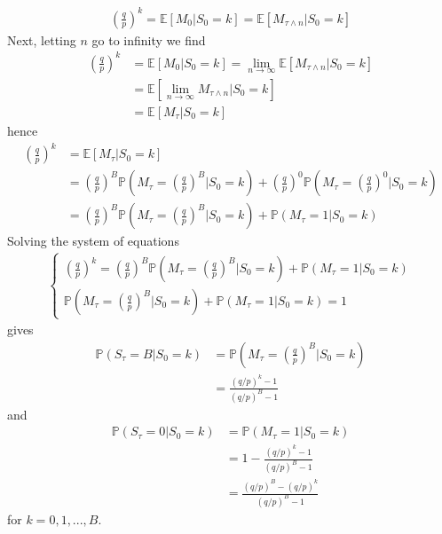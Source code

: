 \documentclass[12pt]{extarticle}
\newcommand{\<}{\langle}
\renewcommand{\>}{\rangle}
\theoremstyle{definition}
\begin{document}
\begin{align*}
    \left( \frac{q}{p} \right)^k = \mathbb{E}[M_0 | S_0 =k] = \mathbb{E}[M_{\tau \wedge n} | S_0 =k]
\end{align*}
Next, letting $n$ go to infinity we find
\begin{align*}
    \left( \frac{q}{p} \right)^k &= \mathbb{E}[M_0 | S_0 =k] = \lim_{n \to \infty}\mathbb{E}[M_{\tau \wedge n} | S_0 =k]\\
    &= \mathbb{E}[\lim_{n \to \infty}M_{\tau \wedge n} | S_0 =k]\\
    &= \mathbb{E}[M_\tau | S_0 =k]
\end{align*}
hence
\begin{align*}
    \left( \frac{q}{p} \right)^k &= \mathbb{E}[M_\tau | S_0 =k]\\
    &= \left( \frac{q}{p} \right)^B \mathbb{P}\left(M_\tau = \left( \frac{q}{p} \right)^B \bigg| S_0 =k \right) + \left( \frac{q}{p} \right)^0 \mathbb{P}\left(M_\tau = \left( \frac{q}{p} \right)^0 \bigg| S_0 =k \right)\\
    &= \left( \frac{q}{p} \right)^B \mathbb{P}\left(M_\tau = \left( \frac{q}{p} \right)^B \bigg| S_0 =k \right) + \mathbb{P}(M_\tau = 1 | S_0 =k )
\end{align*}
Solving the system of equations
\begin{align*}
    \begin{cases}
    \left( \frac{q}{p} \right)^k = \left( \frac{q}{p} \right)^B \mathbb{P}\left(M_\tau = \left( \frac{q}{p} \right)^B \bigg| S_0 =k \right) + \mathbb{P}(M_\tau = 1 | S_0 =k )\\
    \mathbb{P}\left(M_\tau = \left( \frac{q}{p} \right)^B \bigg| S_0 =k \right) + \mathbb{P}(M_\tau = 1 | S_0 =k ) =1
    \end{cases}
\end{align*}
gives
\begin{align*}
    \mathbb{P}(S_\tau = B | S_0 =k ) &= \mathbb{P}\left(M_\tau = \left( \frac{q}{p} \right)^B \bigg| S_0 =k \right)\\
    &= \frac{(q/p)^k -1}{(q/p)^B -1}
\end{align*}
and
\begin{align*}
    \mathbb{P}(S_\tau = 0 | S_0 =k ) &= \mathbb{P}(M_\tau = 1 | S_0 =k)\\
    &= 1- \frac{(q/p)^k -1}{(q/p)^B -1}\\
    &= \frac{(q/p)^B - (q/p)^k}{(q/p)^B -1}
\end{align*}
for $k=0,1,...,B$.
\end{document}
